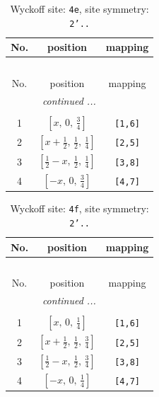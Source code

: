 \documentclass[fleqn,8pt]{jsarticle}
\begin{document}
\begin{longtable}{ccc}
\caption{Wyckoff site: {\tt 4e}, site symmetry: {\tt 2'..}}
 \\
 \hline \hline
No. & position & mapping \\ \hline \endfirsthead

\multicolumn{2}{l}{\tablename\ \thetable{}} \\
 \hline \hline
No. & position & mapping \\ \hline \endhead

 \hline \hline
\multicolumn{2}{r}{\footnotesize\it continued ...} \\ \endfoot

 \hline \hline
\multicolumn{2}{r}{} \\ \endlastfoot

1 & $\left[ x,\, 0,\, \frac{3}{4} \right]$ & {\tt [1,6]} \\ \hline
2 & $\left[ x + \frac{1}{2},\, \frac{1}{2},\, \frac{1}{4} \right]$ & {\tt [2,5]} \\ \hline
3 & $\left[ \frac{1}{2} - x,\, \frac{1}{2},\, \frac{1}{4} \right]$ & {\tt [3,8]} \\ \hline
4 & $\left[ - x,\, 0,\, \frac{3}{4} \right]$ & {\tt [4,7]} \\
\end{longtable}
\renewcommand{\arraystretch}{1.2}
\begin{longtable}{ccc}
\caption{Wyckoff site: {\tt 4f}, site symmetry: {\tt 2'..}}
 \\
 \hline \hline
No. & position & mapping \\ \hline \endfirsthead

\multicolumn{2}{l}{\tablename\ \thetable{}} \\
 \hline \hline
No. & position & mapping \\ \hline \endhead

 \hline \hline
\multicolumn{2}{r}{\footnotesize\it continued ...} \\ \endfoot

 \hline \hline
\multicolumn{2}{r}{} \\ \endlastfoot

1 & $\left[ x,\, 0,\, \frac{1}{4} \right]$ & {\tt [1,6]} \\ \hline
2 & $\left[ x + \frac{1}{2},\, \frac{1}{2},\, \frac{3}{4} \right]$ & {\tt [2,5]} \\ \hline
3 & $\left[ \frac{1}{2} - x,\, \frac{1}{2},\, \frac{3}{4} \right]$ & {\tt [3,8]} \\ \hline
4 & $\left[ - x,\, 0,\, \frac{1}{4} \right]$ & {\tt [4,7]} \\
\end{longtable}
\end{document}
